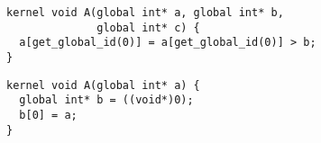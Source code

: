 \newsavebox{\BeigPtrAssertion}
\begin{lrbox}{\BeigPtrAssertion}
  \begin{minipage}{\textwidth}
    \begin{verbatim}
kernel void A(global int* a, global int* b,
              global int* c) {
  a[get_global_id(0)] = a[get_global_id(0)] > b;
}
    \end{verbatim}
  \end{minipage}
\end{lrbox}

\newsavebox{\BeigIterAssertion}
\begin{lrbox}{\BeigIterAssertion}
  \begin{minipage}{\textwidth}
    \begin{verbatim}
kernel void A(global int* a) {
  global int* b = ((void*)0);
  b[0] = a;
}
    \end{verbatim}
  \end{minipage}
\end{lrbox}
